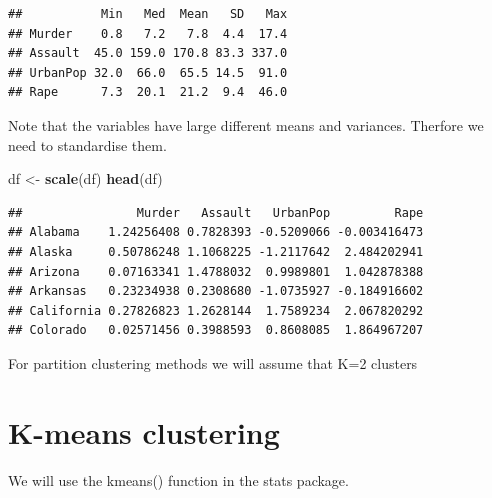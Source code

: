 \documentclass[
]{book}
\newenvironment{Shaded}{\begin{snugshade}}{\end{snugshade}}
\newcommand{\CommentTok}[1]{\textcolor[rgb]{0.56,0.35,0.01}{\textit{#1}}}
\newcommand{\DataTypeTok}[1]{\textcolor[rgb]{0.13,0.29,0.53}{#1}}
\newcommand{\DecValTok}[1]{\textcolor[rgb]{0.00,0.00,0.81}{#1}}
\newcommand{\KeywordTok}[1]{\textcolor[rgb]{0.13,0.29,0.53}{\textbf{#1}}}
\newcommand{\NormalTok}[1]{#1}
\newcommand{\OperatorTok}[1]{\textcolor[rgb]{0.81,0.36,0.00}{\textbf{#1}}}
\newcommand{\StringTok}[1]{\textcolor[rgb]{0.31,0.60,0.02}{#1}}
\begin{document}
\begin{verbatim}
##           Min   Med  Mean   SD   Max
## Murder    0.8   7.2   7.8  4.4  17.4
## Assault  45.0 159.0 170.8 83.3 337.0
## UrbanPop 32.0  66.0  65.5 14.5  91.0
## Rape      7.3  20.1  21.2  9.4  46.0
\end{verbatim}

Note that the variables have large different means and variances. Therfore we need to standardise them.

\begin{Shaded}
\begin{Highlighting}[]
\NormalTok{df <-}\StringTok{ }\KeywordTok{scale}\NormalTok{(df)}
\KeywordTok{head}\NormalTok{(df)}
\end{Highlighting}
\end{Shaded}

\begin{verbatim}
##                Murder   Assault   UrbanPop         Rape
## Alabama    1.24256408 0.7828393 -0.5209066 -0.003416473
## Alaska     0.50786248 1.1068225 -1.2117642  2.484202941
## Arizona    0.07163341 1.4788032  0.9989801  1.042878388
## Arkansas   0.23234938 0.2308680 -1.0735927 -0.184916602
## California 0.27826823 1.2628144  1.7589234  2.067820292
## Colorado   0.02571456 0.3988593  0.8608085  1.864967207
\end{verbatim}

For partition clustering methods we will assume that K=2 clusters

\hypertarget{k-means-clustering}{%
\section{K-means clustering}\label{k-means-clustering}}

We will use the kmeans() function in the stats package.

\begin{Shaded}
\end{Shaded}
\end{document}
